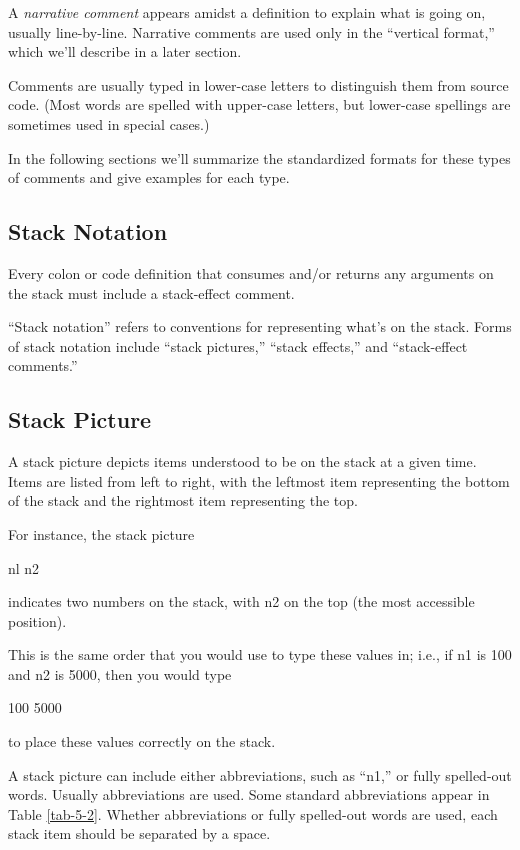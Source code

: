 A \emph{narrative comment} appears amidst a definition to explain what is
going on, usually line-by-line.  Narrative comments are used only in the
``vertical format,'' which we'll describe in a later section.

Comments are usually typed in lower-case letters to distinguish
them from source code.  (Most \Forth{} words are spelled with upper-case
letters, but lower-case spellings are sometimes used in special cases.)

In the following sections we'll summarize the standardized formats
for these types of comments and give examples for each type.

\subsection{Stack Notation}
\begin{tip}
Every colon or code definition that consumes and/or returns any arguments
on the stack must include a stack-effect comment.
\end{tip}


``Stack notation'' refers to conventions for representing what's on the
stack.  Forms of stack notation include ``stack pictures,'' ``stack effects,''
and ``stack-effect comments.''

\subsection{Stack Picture}

A stack picture depicts items understood to be on the stack at a given
time.  Items are listed from left to right, with the leftmost item representing
the bottom of the stack and the rightmost item representing the top.

For instance, the stack picture
\begin{Code}
nl n2
\end{Code}
indicates two numbers on the stack, with n2 on the top (the most accessible
position).

This is the same order that you would use to type these values in;
i.e., if n1 is 100 and n2 is 5000, then you would type
\begin{Code}
100 5000
\end{Code}
to place these values correctly on the stack.

A stack picture can include either abbreviations, such as ``n1,'' or
fully spelled-out words.  Usually abbreviations are used.  Some
standard abbreviations appear in Table \ref{tab-5-2}.  Whether
abbreviations or fully spelled-out words are used, each stack item
should be separated by a space.

